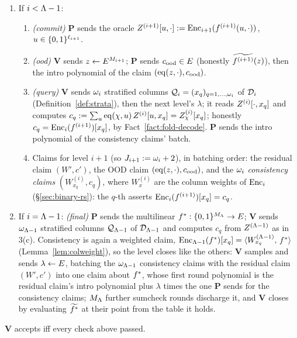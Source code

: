 \begin{protocol}
\begin{enumerate}[itemsep=0.5pt,topsep=2pt]
Set $\fc := (\fc_1, \dots, \fc_{\ell_i})$, $c' := \rc{\ell_i}$, and, for $x \in \cube{\nv_{i+1}}$: \ $f^{(i+1)}(x) := \mle{f^{(i)}}(\fc, x)$, \ $W'(x) := \mle{W}(\fc, x)$. The \emph{residual claim} $(W', c')$ is a weighted claim about the folded multilinear $f^{(i+1)} : \cube{\nv_{i+1}} \to \E$.
\item If $i < \Lambda - 1$:
\begin{enumerate}[itemsep=0.5pt,topsep=1pt,label=(\alph*)]
\item \emph{(commit)} $\mathbf{P}$ sends the oracle $Z^{(i+1)}[u, \cdot] := \mathrm{Enc}_{i+1}(f^{(i+1)}(u, \cdot))$, $u \in \{0,1\}^{\ell_{i+1}}$.
\item \emph{(ood)} $\mathbf{V}$ sends $z \leftarrow E^{M_{i+1}}$; $\mathbf{P}$ sends $c_{\mathrm{ood}} \in E$ (honestly $\widetilde{f^{(i+1)}}(z)$), then the intro polynomial of the claim $(\operatorname{eq}(z, \cdot), c_{\mathrm{ood}})$.
\item \emph{(query)} $\mathbf{V}$ sends $\omega_i$ stratified columns $\mathcal{Q}_i = (x_q)_{q = 1, \dots, \omega_i}$ of $\mathcal{D}_i$ (Definition~\ref{def:strata}), then the next level's $\lambda$; it reads $Z^{(i)}[\cdot, x_q]$ and computes $c_q := \sum_{u} \operatorname{eq}(\chi, u)\, Z^{(i)}[u, x_q] = Z^{(i)}_\chi[x_q]$; honestly $c_q = \mathrm{Enc}_i(f^{(i+1)})[x_q]$, by Fact~\ref{fact:fold-decode}. $\mathbf{P}$ sends the intro polynomial of the consistency claims' batch.
\item Claims for level $i+1$ (so $J_{i+1} := \omega_i + 2$), in batching order: the residual claim $(W', c')$, the OOD claim $(\operatorname{eq}(z, \cdot), c_{\mathrm{ood}})$, and the $\omega_i$ \emph{consistency claims} $(W^{(i)}_{x_q}, c_q)$, where $W^{(i)}_x$ are the column weights of $\mathrm{Enc}_i$ (\S\ref{sec:binary-rs}): the $q$-th asserts $\mathrm{Enc}_i(f^{(i+1)})[x_q] = c_q$.
\end{enumerate}
\item If $i = \Lambda - 1$: \emph{(final)} $\mathbf{P}$ sends the multilinear $f^{\ast} : \{0,1\}^{M_\Lambda} \to E$; $\mathbf{V}$ sends $\omega_{\Lambda-1}$ stratified columns $\mathcal{Q}_{\Lambda-1}$ of $\mathcal{D}_{\Lambda-1}$ and computes $c_q$ from $Z^{(\Lambda-1)}$ as in 3(c). Consistency is again a weighted claim, $\mathrm{Enc}_{\Lambda-1}(f^{\ast})[x_q] = \langle W^{(\Lambda-1)}_{x_q},\, f^{\ast} \rangle$ (Lemma~\ref{lem:colweight}), so the level closes like the others: $\mathbf{V}$ samples and sends $\lambda \leftarrow E$, batching the $\omega_{\Lambda-1}$ consistency claims with the residual claim $(W', c')$ into one claim about $f^{\ast}$, whose first round polynomial is the residual claim's intro polynomial plus $\lambda$ times the one $\mathbf{P}$ sends for the consistency claims; $M_\Lambda$ further sumcheck rounds discharge it, and $\mathbf{V}$ closes by evaluating $\widetilde{f^{\ast}}$ at their point from the table it holds.
\end{enumerate}
$\mathbf{V}$ accepts iff every check above passed.
\end{protocol}

